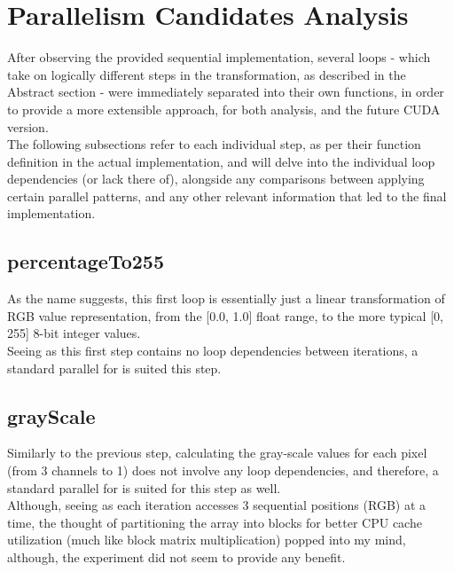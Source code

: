 \documentclass[sigconf]{acmart}
\begin{document}
\maketitle

\section{Parallelism Candidates Analysis}

After observing the provided sequential implementation, several loops - which take on logically different steps in the transformation, as described in the Abstract section - were immediately separated into their own functions, in order to provide a more extensible approach, for both analysis, and the future CUDA version.\\

The following subsections refer to each individual step, as per their function definition in the actual implementation, and will delve into the individual loop dependencies (or lack there of), alongside any comparisons between applying certain parallel patterns, and any other relevant information that led to the final implementation.

\subsection{percentageTo255}

As the name suggests, this first loop is essentially just a linear transformation of RGB value representation, from the [0.0, 1.0] float range, to the more typical [0, 255] 8-bit integer values.\\
Seeing as this first step contains no loop dependencies between iterations, a standard parallel for is suited this step.

\subsection{grayScale}

Similarly to the previous step, calculating the gray-scale values for each pixel (from 3 channels to 1) does not involve any loop dependencies, and therefore, a standard parallel for is suited for this step as well.\\

Although, seeing as each iteration accesses 3 sequential positions (RGB) at a time, the thought of partitioning the array into blocks for better CPU cache utilization (much like block matrix multiplication) popped into my mind, although, the experiment did not seem to provide any benefit.
\end{document}
